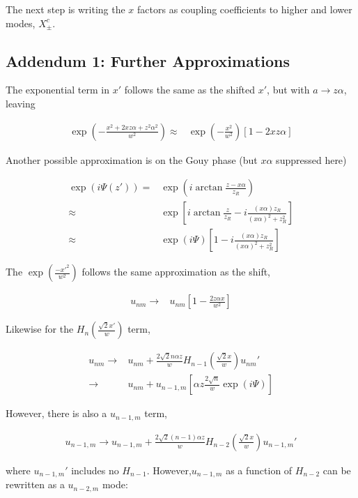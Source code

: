 \documentclass[aps,twoside,secnumarabic,balancelastpage,amsmath,amssymb,nofootinbib,hyperref=pdftex]{revtex4}
\begin{document}
The next step is writing the $x$ factors as coupling coefficients to higher and lower modes, $X_\pm^{c}$.

\clearpage 

\subsection{Addendum 1: Further Approximations}

The exponential term in $x'$ follows the same as the shifted $x'$, but with $a\rightarrow z\alpha$, leaving

\begin{align*}
	\exp(-\frac{x^2+2xz\alpha + z^2\alpha^2}{w^2})
	\approx&
	\exp(-\frac{x^2}{w^2})[1-2xz\alpha]
\end{align*}

Another possible approximation is on the Gouy phase (but $x\alpha$ suppressed here)

\begin{align*}
	\exp(i\Psi(z')) =&
	\exp(i\arctan\frac{z-x\alpha}{z_R} )
	\\ \approx &
	\exp[
	i\arctan\frac{z}{z_R} 
	-
	i
	\frac{(x \alpha) z_R}{(x \alpha)^2 + z_R^2}
	]
	\\ \approx&
	\exp(i \Psi)
	[
	1 
	-
	i
	\frac{(x \alpha) z_R}{(x \alpha)^2 + z_R^2}
	]
\end{align*}

The $\exp(\frac{-x'^2}{w^2})$ follows the same approximation as the shift,

\begin{align*}
	u_{nm} \rightarrow &
	u_{nm}[1 - \frac{2z\alpha x}{w^2}]
\end{align*} 

Likewise for the $H_n(\frac{\sqrt{2}x'}{w})$ term,

\begin{align*}
u_{nm} \rightarrow & u_{nm} + \frac{2\sqrt{2}n \alpha z}{w}
	 	 H_{n-1}(\frac{\sqrt{2}x}{w}) u_{nm}'
	 	 	\\ \rightarrow &
	u_{nm}+
	u_{n-1,m} [
		\alpha z \frac{2 \sqrt{n}}{w} 
	\exp(i \Psi)	] 
\end{align*}

However, there is also a $u_{n-1,m}$ term,

\begin{align*}
u_{n-1,m} \rightarrow u_{n-1,m} + \frac{2\sqrt{2}(n-1) \alpha z}{w}
	 	 H_{n-2}(\frac{\sqrt{2}x}{w}) u_{n-1,m}'	 	
\end{align*}

where $u_{n-1,m}'$ includes no $H_{n-1}$. However,$u_{n-1,m}$ as a function of $H_{n-2}$ can be rewritten as a $u_{n-2,m}$ mode:
\end{document}

